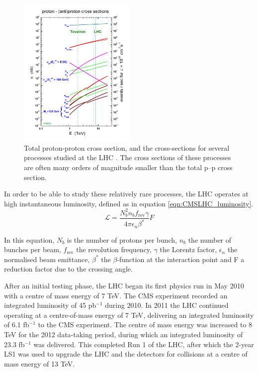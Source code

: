 \begin{figure}[h!]
\includegraphics[width=0.5\textwidth]{./Detector/Plots/crosssections2013.jpg}
\caption{Total proton-proton cross section, and the cross-sections
for several processes studied at the LHC \cite{stirling-crosssection}.
The cross sections of these processes
are often many orders of magnitude smaller than the total p--p cross section.}
\label{fig:stirling_xs}
\end{figure}

In order to be able to study these relatively rare processes, 
the LHC operates at high instantaneous luminosity, defined as in equation
\ref{eqn:CMSLHC_luminosity}. 
\begin{equation}\label{eqn:CMSLHC_luminosity}
\mathcal{L} = \frac{N_b^2n_bf_{\text{rev}}\gamma}{4\pi\epsilon_n\beta^{*}}F
\end{equation}

In this equation, $N_b$ is the number of protons per bunch, $n_b$ the number of
bunches per beam, $f_{\text{rev}}$ the revolution frequency, $\gamma$ the 
Lorentz factor, $\epsilon_n$ the normalised beam
emittance, $\beta^{*}$ the $\beta$-function at the interaction point and F a reduction
factor due to the crossing angle. 

After an initial testing phase, the \ac{LHC} began its first physics run in May 2010 with 
a centre of mass energy of 7 TeV. The CMS experiment recorded an integrated luminosity of 45 pb$^{-1}$
during 2010. In 2011 the \ac{LHC} continued operating at a centre-of-mass energy of 7 TeV, delivering an integrated 
luminosity of 6.1 fb$^{-1}$ to the CMS experiment. The centre of mass energy was increased to 8 TeV
for the 2012 data-taking period, during which an integrated luminosity of 23.3 fb$^{-1}$ was delivered.
This completed Run 1 of the \ac{LHC}, after which the 2-year \ac{LS1} was used to 
upgrade the LHC and the detectors for collisions at a centre of mass energy of 13 TeV.

